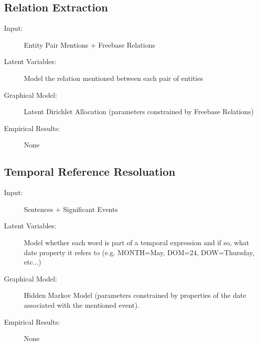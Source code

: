 \documentclass[12pt]{article}
\begin{document}
\subsection{Relation Extraction}
\begin{description}
\item[Input:] Entity Pair Mentions + Freebase Relations
\item[Latent Variables:] Model the relation mentioned between each pair of entities
\item[Graphical Model:] Latent Dirichlet Allocation (parameters constrained by Freebase Relations)
\item[Empirical Results:] None
\end{description}

\subsection{Temporal Reference Resoluation}
\begin{description}
\item[Input:] Sentences + Significant Events
\item[Latent Variables:] Model whether each word is part of a temporal expression and if so, what date property it refers to (e.g. MONTH=May, DOM=24, DOW=Thursday, etc...)
\item[Graphical Model:] Hidden Markov Model (parameters constrained by properties of the date associated with the mentioned event).
\item[Empirical Results:] None
\end{description}
\end{document}
